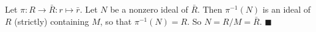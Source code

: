 Let $\pi : R \to \bar{R} : r \mapsto \bar{r}$. Let $N$ be a nonzero ideal of $\bar{R}$. Then $\pi^{-1}(N)$ is an ideal of $R$ (strictly) containing $M$, so that $\pi^{-1}(N)=R$. So $N= R/M = \bar{R}$. 
 $\blacksquare$